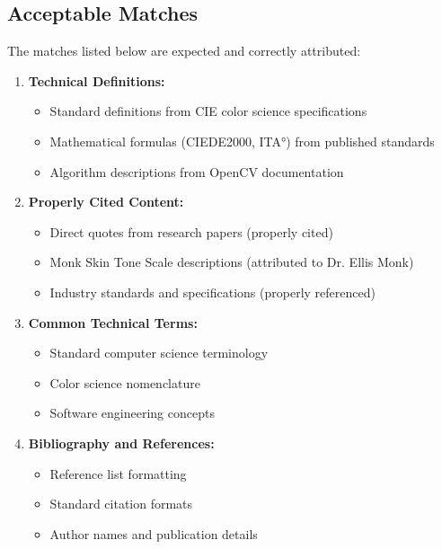 \subsection{Acceptable Matches}

The matches listed below are expected and correctly attributed:

\begin{enumerate}
    \item \textbf{Technical Definitions:}
    \begin{itemize}
        \item Standard definitions from CIE color science specifications
        \item Mathematical formulas (CIEDE2000, ITA°) from published standards
        \item Algorithm descriptions from OpenCV documentation
    \end{itemize}
    
    \item \textbf{Properly Cited Content:}
    \begin{itemize}
        \item Direct quotes from research papers (properly cited)
        \item Monk Skin Tone Scale descriptions (attributed to Dr. Ellis Monk)
        \item Industry standards and specifications (properly referenced)
    \end{itemize}
    
    \item \textbf{Common Technical Terms:}
    \begin{itemize}
        \item Standard computer science terminology
        \item Color science nomenclature
        \item Software engineering concepts
    \end{itemize}
    
    \item \textbf{Bibliography and References:}
    \begin{itemize}
        \item Reference list formatting
        \item Standard citation formats
        \item Author names and publication details
    \end{itemize}
\end{enumerate}

